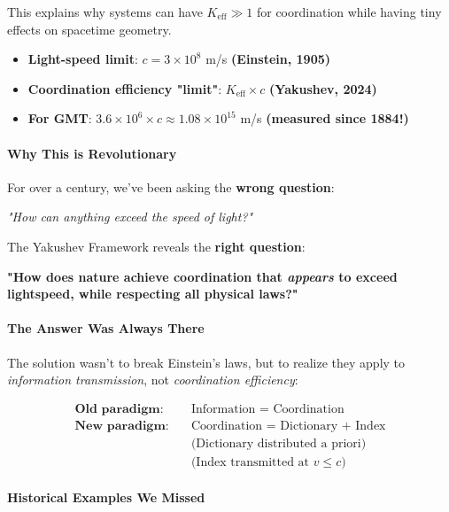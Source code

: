 \documentclass[11pt,a4paper]{article}
\begin{document}
This explains why systems can have $K_{\mathrm{eff}} \gg 1$ for coordination while having tiny effects on spacetime geometry.
	\begin{itemize}
		\item \textbf{Light-speed limit}: $c = 3 \times 10^8$ m/s \textbf{(Einstein, 1905)}
		\item \textbf{Coordination efficiency "limit"}: $K_{\mathrm{eff}} \times c$ \textbf{(Yakushev, 2024)}
		\item \textbf{For GMT}: $3.6 \times 10^6 \times c \approx 1.08 \times 10^{15}$ m/s \textbf{(measured since 1884!)}
	\end{itemize}
	
	\paragraph{Why This is Revolutionary}
	For over a century, we've been asking the \textbf{wrong question}:
	\begin{center}
		\itshape "How can anything exceed the speed of light?" 
	\end{center}
	
	The Yakushev Framework reveals the \textbf{right question}:
	\begin{center}
		\bfseries "How does nature achieve coordination that \emph{appears} to exceed lightspeed, while respecting all physical laws?"
	\end{center}
	
	\paragraph{The Answer Was Always There}
	The solution wasn't to break Einstein's laws, but to realize they apply to \emph{information transmission}, not \emph{coordination efficiency}:
	
	\begin{align*}
		\textbf{Old paradigm:} & \quad \text{Information = Coordination} \\
		\textbf{New paradigm:} & \quad \text{Coordination = Dictionary + Index} \\
		& \quad \text{(Dictionary distributed a priori)} \\
		& \quad \text{(Index transmitted at $v \leq c$)}
	\end{align*}
	
	\paragraph{Historical Examples We Missed}
	
\end{document}
